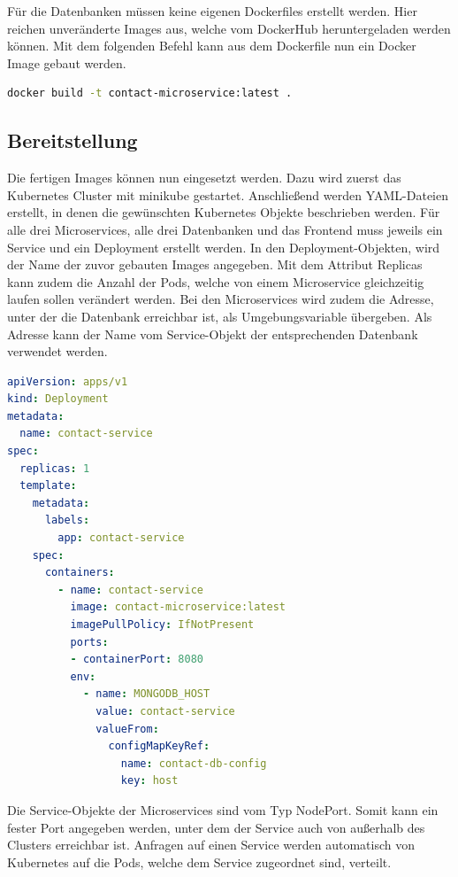 Für die Datenbanken müssen keine eigenen Dockerfiles erstellt werden. Hier reichen unveränderte Images aus, welche vom DockerHub heruntergeladen werden können. Mit dem folgenden Befehl kann aus dem Dockerfile nun ein Docker Image gebaut werden.

\begin{lstlisting}[language=bash, caption=Docker-Befehl für das Bauen eines Images, captionpos=b]
docker build -t contact-microservice:latest .
\end{lstlisting}

\subsection{Bereitstellung}

Die fertigen Images können nun eingesetzt werden. Dazu wird zuerst das Kubernetes Cluster mit minikube gestartet. Anschließend werden YAML-Dateien erstellt, in denen die gewünschten Kubernetes Objekte beschrieben werden. Für alle drei Microservices, alle drei Datenbanken und das Frontend muss jeweils ein Service und ein Deployment erstellt werden. In den Deployment-Objekten, wird der Name der zuvor gebauten Images angegeben. Mit dem Attribut Replicas kann zudem die Anzahl der Pods, welche von einem Microservice gleichzeitig laufen sollen verändert werden. Bei den Microservices wird zudem die Adresse, unter der die Datenbank erreichbar ist, als Umgebungsvariable übergeben. Als Adresse kann der Name vom Service-Objekt der entsprechenden Datenbank verwendet werden.

\begin{lstlisting}[language=YAML, caption=Deployment-Objekt vom Kontakt-Microservice]
apiVersion: apps/v1
kind: Deployment
metadata:
  name: contact-service
spec:
  replicas: 1
  template:
    metadata:
      labels:
        app: contact-service
    spec:
      containers:
        - name: contact-service
          image: contact-microservice:latest
          imagePullPolicy: IfNotPresent
          ports:
          - containerPort: 8080
          env:
            - name: MONGODB_HOST
              value: contact-service
              valueFrom:
                configMapKeyRef:
                  name: contact-db-config  
                  key: host
\end{lstlisting}

Die Service-Objekte der Microservices sind vom Typ NodePort. Somit kann ein fester Port angegeben werden, unter dem der Service auch von außerhalb des Clusters erreichbar ist. Anfragen auf einen Service werden automatisch von Kubernetes auf die Pods, welche dem Service zugeordnet sind, verteilt. 

